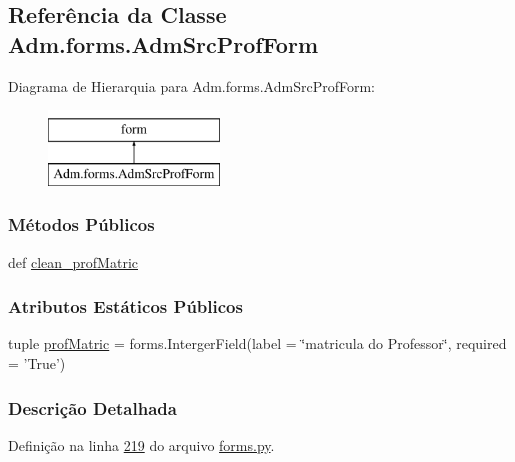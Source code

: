 \hypertarget{classAdm_1_1forms_1_1AdmSrcProfForm}{\subsection{Referência da Classe Adm.\-forms.\-Adm\-Src\-Prof\-Form}
\label{classAdm_1_1forms_1_1AdmSrcProfForm}
}
Diagrama de Hierarquia para Adm.\-forms.\-Adm\-Src\-Prof\-Form\-:\begin{figure}[H]
\begin{center}
\leavevmode
\includegraphics[height=2.000000cm]{d5/d6d/classAdm_1_1forms_1_1AdmSrcProfForm}
\end{center}
\end{figure}
\subsubsection*{Métodos Públicos}
\begin{DoxyCompactItemize}
\item 
def \hyperlink{classAdm_1_1forms_1_1AdmSrcProfForm_a637026e6ec06d0c9c02f00394b140eec}{clean\-\_\-prof\-Matric}
\end{DoxyCompactItemize}
\subsubsection*{Atributos Estáticos Públicos}
\begin{DoxyCompactItemize}
\item 
tuple \hyperlink{classAdm_1_1forms_1_1AdmSrcProfForm_a774a36bf303e747a3139b988a4a714b3}{prof\-Matric} = forms.\-Interger\-Field(label = \char`\"{}matricula do Professor\char`\"{}, required = 'True')
\end{DoxyCompactItemize}


\subsubsection{Descrição Detalhada}


Definição na linha \hyperlink{Adm_2forms_8py_source_l00219}{219} do arquivo \hyperlink{Adm_2forms_8py_source}{forms.\-py}.



